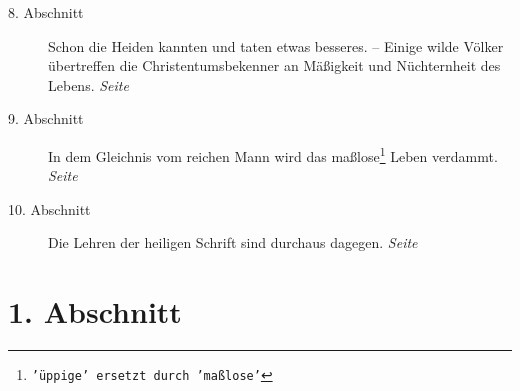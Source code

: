 \begin{description}
\item[8. Abschnitt] Schon die Heiden kannten und taten etwas besseres. --
Einige wilde Völker übertreffen die Christentumsbekenner an Mäßigkeit und
Nüchternheit des Lebens.
\dotfill \textit{Seite~\pageref{kap14_ab8}}\\
\item[9. Abschnitt] In dem Gleichnis vom reichen Mann wird das
maßlose\footnote{\texttt{'üppige' ersetzt durch 'maßlose'}} Leben
verdammt.
\dotfill \textit{Seite~\pageref{kap14_ab9}}\\
\item[10. Abschnitt] Die Lehren der heiligen Schrift sind durchaus dagegen.
\dotfill \textit{Seite~\pageref{kap14_ab10}}\\
\end{description}

\newpage

\section{1. Abschnitt} \label{kap14_ab1}

